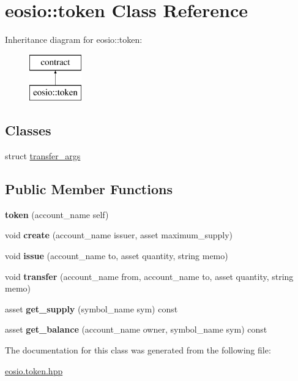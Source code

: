 \hypertarget{classeosio_1_1token}{}\section{eosio\+:\+:token Class Reference}
\label{classeosio_1_1token}
Inheritance diagram for eosio\+:\+:token\+:\begin{figure}[H]
\begin{center}
\leavevmode
\includegraphics[height=2.000000cm]{classeosio_1_1token}
\end{center}
\end{figure}
\subsection*{Classes}
\begin{DoxyCompactItemize}
\item 
struct \mbox{\hyperlink{structeosio_1_1token_1_1transfer__args}{transfer\+\_\+args}}
\end{DoxyCompactItemize}
\subsection*{Public Member Functions}
\begin{DoxyCompactItemize}
\item 
\mbox{\label{classeosio_1_1token_a7801da676025bec2aa60f593a087db7d}} 
{\bfseries token} (account\+\_\+name self)
\item 
\mbox{\label{classeosio_1_1token_a1e7089cad09c0249ce4d2f47ccbb9942}} 
void {\bfseries create} (account\+\_\+name issuer, asset maximum\+\_\+supply)
\item 
\mbox{\label{classeosio_1_1token_aef8a69104976ee830d962497e94e7b6e}} 
void {\bfseries issue} (account\+\_\+name to, asset quantity, string memo)
\item 
\mbox{\label{classeosio_1_1token_aafe5682cca020207b34955e906515567}} 
void {\bfseries transfer} (account\+\_\+name from, account\+\_\+name to, asset quantity, string memo)
\item 
\mbox{\label{classeosio_1_1token_aacccf9bdb83b64ee84ddcae15a742697}} 
asset {\bfseries get\+\_\+supply} (symbol\+\_\+name sym) const
\item 
\mbox{\label{classeosio_1_1token_acc67ddf282374d0e87e776b8f7843fd7}} 
asset {\bfseries get\+\_\+balance} (account\+\_\+name owner, symbol\+\_\+name sym) const
\end{DoxyCompactItemize}


The documentation for this class was generated from the following file\+:\begin{DoxyCompactItemize}
\item 
\mbox{\hyperlink{eosio_8token_8hpp}{eosio.\+token.\+hpp}}\end{DoxyCompactItemize}
